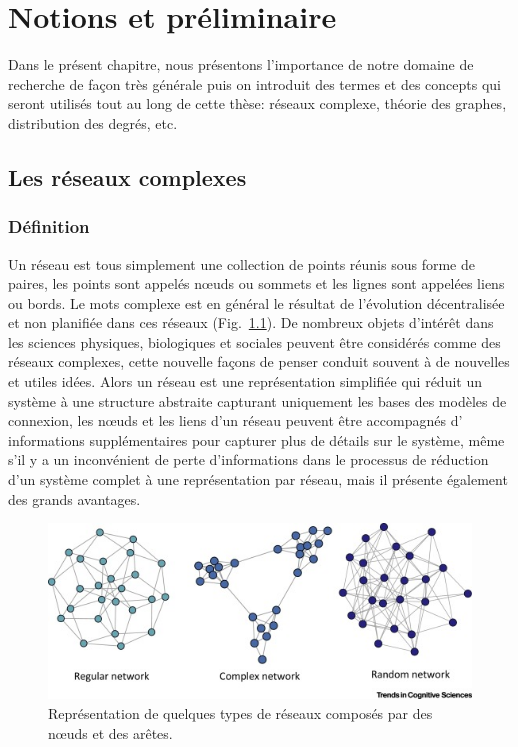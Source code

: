 %
\chapter{Notions et préliminaire}
Dans le présent chapitre, nous présentons l'importance de notre domaine de recherche de façon très générale puis on introduit des termes et des concepts qui seront utilisés tout au long de cette thèse: réseaux complexe, théorie des graphes, distribution des degrés, etc.
 \section{Les réseaux complexes}
  \subsection{Définition}
  Un \textsf{réseau} est tous simplement une collection de points réunis sous forme de paires, les points sont appelés nœuds ou sommets et les lignes sont appelées liens ou bords. Le mots \textsf{complexe} est en général le résultat de  l'évolution décentralisée et non planifiée dans ces réseaux (Fig.~\ref{exemples-reseaux}). De nombreux objets d'intérêt dans les sciences physiques, biologiques et sociales peuvent être considérés comme des réseaux complexes, cette nouvelle façons de penser conduit souvent à de nouvelles et utiles idées. Alors un réseau est une représentation simplifiée qui réduit un système à une structure abstraite capturant uniquement les bases des modèles de connexion, les nœuds et les liens d'un réseau peuvent être accompagnés d' informations supplémentaires pour capturer plus de détails sur le système, même s'il y a un inconvénient de perte d'informations dans le processus de réduction d'un système complet à une représentation par réseau, mais il présente également des grands avantages.
  
  \begin{figure}[h!]
  	\centering
  	\includegraphics[scale=0.95]{./figures/exemples-reseaux}
  	\caption{Représentation de quelques types de réseaux composés par des nœuds et des arêtes. }
  	\label{exemples-reseaux}
  \end{figure}
